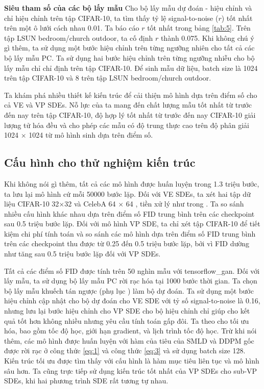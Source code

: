 \documentclass{article} %
\begin{document}
\textbf{Siêu tham số của các bộ lấy mẫu} Cho bộ lấy mẫu dự đoán - hiệu chỉnh và chỉ hiệu chỉnh trên tập CIFAR-10, ta tìm thấy tỷ lệ signal-to-noise ($r$) tốt nhất trên một ô lưới cách nhau 0.01.
Ta báo cáo $r$ tốt nhất trong bảng \ref{tab:5}.
Trên tập LSUN bedroom/church outdoor, ta cố định $r$ thành 0.075.
Khi không chú ý gì thêm, ta sử dụng một bước hiệu chỉnh trên từng ngưỡng nhiên cho tất cả các bộ lấy mẫu PC.
Ta sử dụng hai bước hiệu chỉnh trên từng ngưỡng nhiễu cho bộ lấy mẫu chỉ chỉ định trên tập CIFAR-10.
Để sinh mẫu dữ liệu, batch size là 1024 trên tập CIFAR-10 và 8 trên tập LSUN bedroom/church outdoor.

\label{Các cải thiện về kiến trúc mô hình} \label{H}

Ta khám phá nhiều thiết kế kiến trúc để cải thiện mô hình dựa trên điểm số cho cả VE và VP SDEs.
Nỗ lực của ta mang đến chất lượng mẫu tốt nhất từ trước đến nay trên tập CIFAR-10, độ hợp lý tốt nhất từ trước đến nay CIFAR-10 giải lượng tử hóa đều và cho phép các mẫu có độ trung thực cao trên độ phân giải 1024 $\times$ 1024 từ mô hình sinh dựa trên điểm số.

\subsection{Cấu hình cho thử nghiệm kiến trúc} \label{H.1}

Khi không nói gì thêm, tất cả các mô hình được huấn luyện trong 1.3 triệu bước, ta lưu lại mô hình cứ mỗi 50000 bước lặp.
Đối với VE SDEs, ta xét hai tập dữ liệu CIFAR-10 32$\times$32 \citep{krizhevsky2009learning} và CelebA 64 $\times$ 64 \citep{liu2015deep}, tiền xử lý như trong \citep{song2019generative}.
Ta so sánh nhiều cấu hình khác nhau dựa trên điểm số FID trung bình trên các checkpoint sau 0.5 triệu bước lặp.
Đối với mô hình VP SDE, ta chỉ xét tập CIFAR-10 để tiết kiệm chi phí tính toán và so sánh các mô hình dựa trên điểm số FID trung bình trên các checkpoint thu được từ 0.25 đến 0.5 triệu bước lặp, bởi vì FID dường như tăng sau 0.5 triệu bước lặp đối với VP SDEs.

Tất cả các điểm số FID được tính trên 50 nghìn mẫu với tensorflow\_gan.
Đối với lấy mẫu, ta sử dụng bộ lấy mẫu PC rời rạc hóa tại 1000 bước thời gian.
Ta chọn bộ lấy mẫu khuếch tán ngược (phụ lục ) làm bộ dự đoán.
Ta sử dụng một bước hiệu chỉnh cập nhật cho bộ dự đoán cho VE SDE với tỷ số signal-to-noise là 0.16,
nhưng lưu lại bước hiệu chỉnh cho VP SDE cho bộ hiệu chỉnh chỉ giúp cho kết quả tốt hơn không nhiều nhưng yêu cầu tính toán gấp đôi.
Ta theo \citep{ho2020denoising} cho tối ưu hóa, bao gồm tốc độ học, giới hạn gradient, và lịch trình tốc độ học.
Trừ khi nói thêm, các mô hình được huấn luyện với hàm của tiêu của SMLD và DDPM gốc được rời rạc ở công thức \ref{eq:1} và công thức \ref{eq:3} và sử dụng batch size 128.
Kiến trúc tối ưu được tìm thấy với cấu hình là hàm mục tiêu liên tục và mô hình sâu hơn.
Ta cũng trực tiếp sử dụng kiến trúc tốt nhất của VP SDEs cho sub-VP SDEs, khi hai phương trình SDE rất tương tự nhau.
\end{document}
